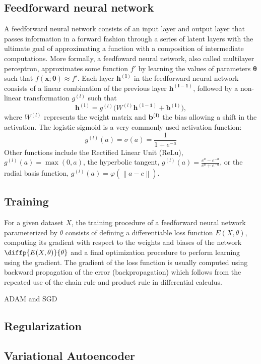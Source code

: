\documentclass[bsc,frontabs,twoside,singlespacing,parskip,deptreport]{infthesis}     %
\begin{document}
\subsection{Feedforward neural network}
A feedforward neural network consists of an input layer and output layer that passes information in a forward fashion through a series of latent layers with the ultimate goal of approximating a function with a composition of intermediate computations. More formally, a feedfoward neural network, also called multilayer perceptron, approximates some function \(f'\) by learning the values of parameters \(\boldsymbol{\theta}\) such that \(f(\boldsymbol{x} ; \boldsymbol{\theta}) \approx f'\).
Each layer \(\bm{h^{(l)}}\)  in the feedforward neural network consists of a linear combination of the previous layer \(\bm{h^{(l-1)}}\), followed by a non-linear transformation \(g^{(l)}\) such that \[\bm{h^{(l)}} = g^{(l)}(W^{(l)}\bm{h^{(l-1)}} + \bm{b^{(l)})},\]
where \(W^{(l)}\) represents the weight matrix and \(\bf{b^{(l)}}\) the bias allowing a shift in the activation. The logistic sigmoid is a very commonly used activation function: \[g^{(l)}(a) = \sigma(a) = \frac{1}{1+e^{-a}}\]
Other functions include the Rectified Linear Unit (ReLu), \(g^{(l)}(a)= \max(0, a)\), the hyperbolic tangent, \(g^{(l)}(a)={\frac {e^{a}-e^{-a}}{e^{a}+e^{-a}}}\), or the radial basis function, \(g^{(l)}(a)=\varphi (\left\|a -c \right\|)\).
\subsection{Training}
For a given dataset \(X\), the training procedure of a feedforward neural network parameterized by \(\theta\) consists of defining a differentiable loss function \(E(X,\theta)\), computing its gradient with respect to the weights and biases of the network \(\diffp{E(X,\theta)}{\theta}\) and a final optimization procedure to perform learning using the gradient.
The gradient of the loss function is usually computed using backward propagation of the error (backpropagation) which follows from the repeated use of the chain rule and product rule in differential calculus.  

ADAM and SGD

\subsection{Regularization}

\subsection{Variational Autoencoder}
\end{document}
